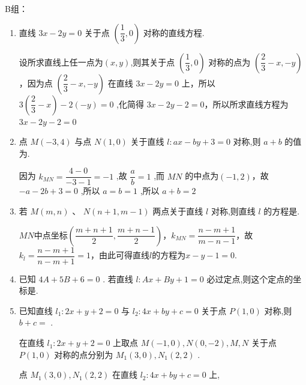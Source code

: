 B组：
\begin{enumerate}
    \item 直线 ${3x} - {2y} = 0$ 关于点 $\left( {\dfrac{1}{3},0}\right)$ 对称的直线方程.
    \begin{jieda}
        设所求直线上任一点为$(x,y)$,则其关于点 $\left( {\dfrac{1}{3},0}\right)$ 对称的点为 $\left( {\dfrac{2}{3} - x, - y}\right)$，因为点 $\left( {\dfrac{2}{3} - x, - y}\right)$ 在直线 ${3x} - {2y} = 0$ 上，所以 $3\left( {\dfrac{2}{3} - x}\right)  - 2\left( {-y}\right)  = 0$ ,化简得 ${3x} - {2y} - 2 = 0$，所以所求直线方程为 ${3x} - {2y} - 2 = 0$
    \end{jieda}

    \item 点 $M\left( {-3,4}\right)$ 与点 $N\left( {1,0}\right)$ 关于直线 $l : {ax} - {by} + 3 = 0$ 对称,则 $a + b$ 的值为. 
    \begin{jieda}
        因为 ${k}_{MN} = \dfrac{4 - 0}{-3 - 1} =  - 1$ ,故 $\dfrac{a}{b} = 1$ ,而 ${MN}$ 的中点为$(-1,2)$，故 $- a - {2b} + 3 = 0$ ,所以 $a = b = 1$ ,所以 $a + b = 2$
    \end{jieda}
    
    \item 若 $M\left( {m,n}\right)$ 、 $N\left( {n + 1,m - 1}\right)$ 两点关于直线 $l$ 对称,则直线 $l$ 的方程是.
    \begin{jieda}
        $MN$中点坐标$\left(\dfrac{m+n+1}{2}, \dfrac{m+n-1}{2}\right)$，$k_{MN} = \dfrac{n-m+1}{m-n-1}$，故$k_l = \dfrac{n-m+1}{n-m+1} = 1$，由此可得直线$l$的方程为$x-y-1=0$.
    \end{jieda}

    \item 已知 ${4A} + {5B} + 6 = 0$ . 若直线 $l : {Ax} + {By} + 1 = 0$ 必过定点,则这个定点的坐标是.

    \item 已知直线 ${l}_{1} : {2x} + y + 2 = 0$ 与 ${l}_{2} : {4x} + {by} + c = 0$ 关于点 $P\left( {1,0}\right)$ 对称,则$b + c =$ .
    \begin{jieda}
        在直线 ${l}_{1} : {2x} + y + 2 = 0$ 上取点 $M\left( {-1,0}\right) ,N\left( {0, - 2}\right) ,M,N$ 关于点 $P\left( {1,0}\right)$ 对称的点分别为 ${M}_{1}\left( {3,0}\right) ,{N}_{1}\left( {2,2}\right)$ .
        
        点 ${M}_{1}\left( {3,0}\right) ,{N}_{1}\left( {2,2}\right)$ 在直线 ${l}_{2} : {4x} + {by} + c = 0$ 上,
        

\end{jieda}
\end{enumerate}
